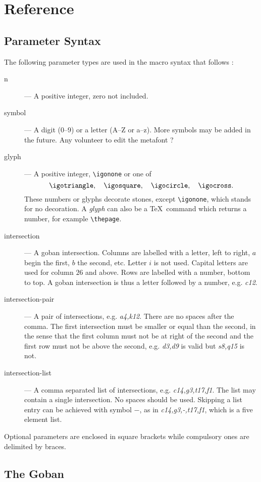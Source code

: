 \documentclass[fleqn]{article}
\begin{document}
\section{Reference}

\subsection{Parameter Syntax}
\label{sec:parameters}

The following parameter types are used in the macro syntax that follows :
\begin{description}
	\item [n] --- A positive integer, zero not included.
	\item [symbol] --- A digit (0--9) or a letter (A--Z or a--z). More symbols may be added in the future. Any volunteer to edit the metafont ?
	\item [glyph] --- A positive integer, \verb|\igonone| or one of \[\verb|\igotriangle|, \quad \verb|\igosquare|, \quad \verb|\igocircle|, \quad \verb|\igocross|.\] These numbers or glyphs decorate stones, except \verb|\igonone|, which stands for no decoration. A \emph{glyph} can also be a \TeX\ command which returns a number, for example \verb|\thepage|.
	\item [intersection] --- A goban intersection. Columns are labelled with a letter, left to right, $a$ begin the first, $b$ the second, etc. Letter $i$ is not used. Capital letters are used for column $26$ and above. Rows are labelled with a number, bottom to top. A goban intersection is thus a letter followed by a number, e.g. \textit{c12}.
	\item [intersection-pair] --- A pair of intersections, e.g. \textit{a4,k12}. There are no spaces after the comma. The first intersection must be smaller or equal than the second, in the sense that the first column must not be at right of the second and the first row must not be above the second, e.g. \textit{d3,d9} is valid but \textit{s8,q15} is not.
	\item [intersection-list] --- A comma separated list of intersections, e.g. \textit{c14,g3,t17,f1}. The list may contain a single intersection. No spaces should be used. Skipping a list entry can be achieved with symbol $-$, as in \textit{c14,g3,-,t17,f1}, which is a five element list.
\end{description}
Optional parameters are enclosed in square brackets while compulsory ones are delimited by braces.

\subsection{The Goban}
\end{document}
